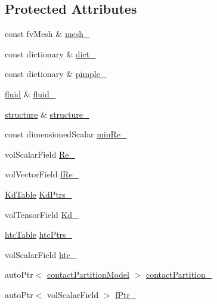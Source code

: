 \subsection*{Protected Attributes}
\begin{DoxyCompactItemize}
\item 
const fv\+Mesh \& \hyperlink{classFoam_1_1FSPair_a23edeeeecebcef11921a33dd5d990570}{mesh\+\_\+}
\item 
const dictionary \& \hyperlink{classFoam_1_1FSPair_a892ddcb9cba6f50b0396cdb7bf1b4f6a}{dict\+\_\+}
\item 
const dictionary \& \hyperlink{classFoam_1_1FSPair_a4f295cc2d5f7221e6e9dffa1b4e90d3c}{pimple\+\_\+}
\item 
\hyperlink{classFoam_1_1fluid}{fluid} \& \hyperlink{classFoam_1_1FSPair_a872731c2885121a0c95701d3dfbcfee9}{fluid\+\_\+}
\item 
\hyperlink{classFoam_1_1structure}{structure} \& \hyperlink{classFoam_1_1FSPair_a1969dfe3e1cb5780f79aa7ea41833dd2}{structure\+\_\+}
\item 
const dimensioned\+Scalar \hyperlink{classFoam_1_1FSPair_af5d92f4d76df8c7ef745993847d90ba5}{min\+Re\+\_\+}
\item 
vol\+Scalar\+Field \hyperlink{classFoam_1_1FSPair_a2df164ac6d2520f15fd568fee117bf4c}{Re\+\_\+}
\item 
vol\+Vector\+Field \hyperlink{classFoam_1_1FSPair_a19c07247a47fe8db8cf7c7692bb2e46d}{l\+Re\+\_\+}
\item 
\hyperlink{classFoam_1_1FSPair_a9fff7443e03586fe1171f2b48bf43ac0}{Kd\+Table} \hyperlink{classFoam_1_1FSPair_a49825a62add84ccd81157c2d2045c97c}{Kd\+Ptrs\+\_\+}
\item 
vol\+Tensor\+Field \hyperlink{classFoam_1_1FSPair_ad7f51dd152601816310889158f9c4207}{Kd\+\_\+}
\item 
\hyperlink{classFoam_1_1FSPair_afcdf367b12288044e3559dd3b09ea5d3}{htc\+Table} \hyperlink{classFoam_1_1FSPair_a8701e7661f33bd079b14a05f36911533}{htc\+Ptrs\+\_\+}
\item 
vol\+Scalar\+Field \hyperlink{classFoam_1_1FSPair_a70b4dd456358653f2576e3d387cc3762}{htc\+\_\+}
\item 
auto\+Ptr$<$ \hyperlink{classFoam_1_1contactPartitionModel}{contact\+Partition\+Model} $>$ \hyperlink{classFoam_1_1FSPair_a474c7a45040de64ddbc19099384d909b}{contact\+Partition\+\_\+}
\item 
auto\+Ptr$<$ vol\+Scalar\+Field $>$ \hyperlink{classFoam_1_1FSPair_a4201dfbab31ceb1e35ce7101411dcbd0}{f\+Ptr\+\_\+}
\end{DoxyCompactItemize}


